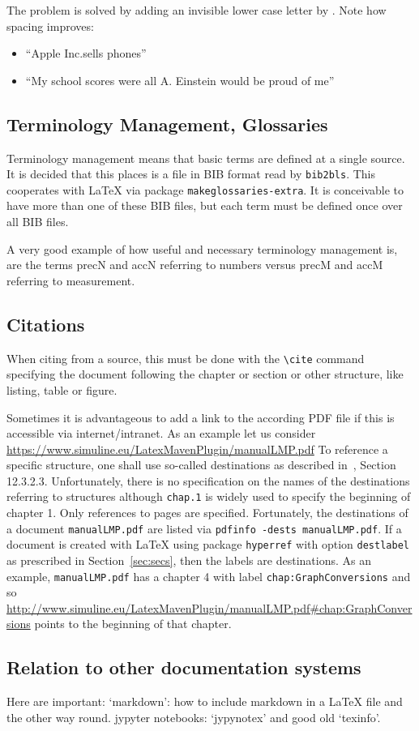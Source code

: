 \documentclass[a4paper,12pt]{article}
\begin{document}
The problem is solved by adding an invisible lower case letter by \texttt{\textbackslash@}. 
Note how spacing improves: 
%
\begin{itemize}
  \item ``Apple Inc.\@ sells phones''
  \item ``My school scores were all A\@. Einstein would be proud of me''
\end{itemize}

\subsection{Terminology Management, Glossaries}\label{subsec:glos}

Terminology management means that basic terms are defined at a single source. 
It is decided that this places is a file in BIB format read by \texttt{bib2bls}. 
This cooperates with \LaTeX{} via package \texttt{makeglossaries-extra}. 
It is conceivable to have more than one of these BIB files, 
but each term must be defined once over all BIB files. 

A very good example of how useful and necessary terminology management is, 
are the terms \gls{precN} and \gls{accN} referring to numbers 
versus \gls{precM} and \gls{accM} referring to measurement. 

\subsection{Citations}

When citing from a source, this must be done with the \texttt{\textbackslash cite} 
command specifying the document following the chapter or section or other structure, 
like listing, table or figure. 

Sometimes it is advantageous to add a link to the according PDF file 
if this is accessible via internet/intranet. 
As an example let us consider \url{https://www.simuline.eu/LatexMavenPlugin/manualLMP.pdf}
To reference a specific structure, 
one shall use so-called destinations as described in~\cite{Pdf17}, 
Section 12.3.2.3. 
Unfortunately, there is no specification on the names of the destinations 
referring to structures 
although \texttt{chap.1} is widely used to specify the beginning of chapter 1. 
Only references to pages are specified. 
Fortunately, the destinations of a document \texttt{manualLMP.pdf} 
are listed via \texttt{pdfinfo -dests manualLMP.pdf}. 
If a document is created with \LaTeX{} using package \texttt{hyperref} 
with option \texttt{destlabel} as prescribed in Section~\ref{sec:secs}, 
then the labels are destinations. 
As an example, \texttt{manualLMP.pdf} has a chapter 4 with label \texttt{chap:GraphConversions}
and so \url{http://www.simuline.eu/LatexMavenPlugin/manualLMP.pdf#chap:GraphConversions} 
points to the beginning of that chapter. 

\subsection{Relation to other documentation systems}

Here are important: 
`markdown': how to include markdown in a \LaTeX{} file and the other way round. 
jypyter notebooks: `jypynotex'
and good old `texinfo'. 



\printunsrtglossaries%

\end{document}

